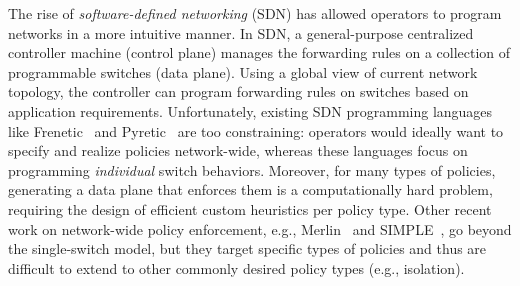 

The rise of \emph{software-defined networking} (SDN) has allowed
operators to program networks in a more intuitive manner. In SDN, a
general-purpose centralized controller machine (control plane) manages
the forwarding rules on a collection of programmable switches (data
plane). Using a global view of current network topology, the
controller can program forwarding rules on switches based on 
application requirements.
Unfortunately, existing SDN programming languages like
Frenetic~\cite{frenetic} and Pyretic~\cite{pyretic} are too
constraining: operators would ideally want to specify and realize
policies network-wide, whereas these languages focus on programming
{\em individual} switch behaviors.  Moreover, for many types of
policies, generating a data plane that enforces them is a
computationally hard problem, requiring the design of efficient custom
heuristics per policy type. Other recent work on network-wide policy
enforcement, e.g., Merlin~\cite{merlin} and SIMPLE~\cite{simple}, go
beyond the single-switch model, but they target specific types of
policies and thus are difficult to extend to other commonly desired
policy types (e.g., isolation).







